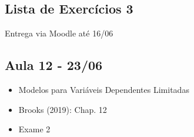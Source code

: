 \documentclass[11pt,]{article}
\providecommand{\tightlist}{%
  \setlength{\itemsep}{0pt}\setlength{\parskip}{0pt}}
\begin{document}
\hypertarget{lista-de-exercuxedcios-3}{%
\subsection{Lista de Exercícios 3}\label{lista-de-exercuxedcios-3}}

Entrega via Moodle até 16/06

\hypertarget{aula-12---2306}{%
\subsection{Aula 12 - 23/06}\label{aula-12---2306}}

\begin{itemize}
\tightlist
\item
  Modelos para Variáveis Dependentes Limitadas
\item
  Brooks (2019): Chap. 12
\item
  Exame 2
\end{itemize}
\end{document}
